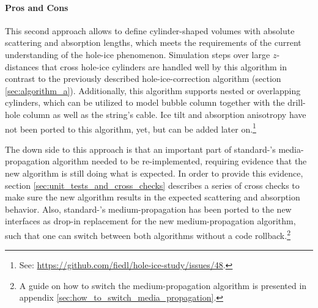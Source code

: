 \paragraph{Pros and Cons}

This second approach allows to define cylinder-shaped volumes with
absolute scattering and absorption lengths, which meets the requirements
of the current understanding of the hole-ice phenomenon. Simulation
steps over large \(z\)-distances that cross hole-ice cylinders are
handled well by this algorithm in contrast to the previously described
hole-ice-correction algorithm (section \ref{sec:algorithm_a}).
Additionally, this algorithm supports nested or overlapping cylinders,
which can be utilized to model bubble column together with the
drill-hole column as well as the string's cable. Ice tilt and absorption
anisotropy have not been ported to this algorithm, yet, but can be added
later
on.\footnote{See: \url{https://github.com/fiedl/hole-ice-study/issues/48}.}

The down side to this approach is that an important part of
standard-\clsim's media-propagation algorithm needed to be
re-implemented, requiring evidence that the new algorithm is still doing
what is expected. In order to provide this evidence, section
\ref{sec:unit_tests_and_cross_checks} describes a series of cross checks
to make sure the new algorithm results in the expected scattering and
absorption behavior. Also, standard-\clsim's medium-propagation has been
ported to the new interfaces as drop-in replacement for the new
medium-propagation algorithm, such that one can switch between both
algorithms without a code
rollback.\footnote{A guide on how to switch the medium-propagation algorithm is presented in appendix \ref{sec:how_to_switch_media_propagation}.}

